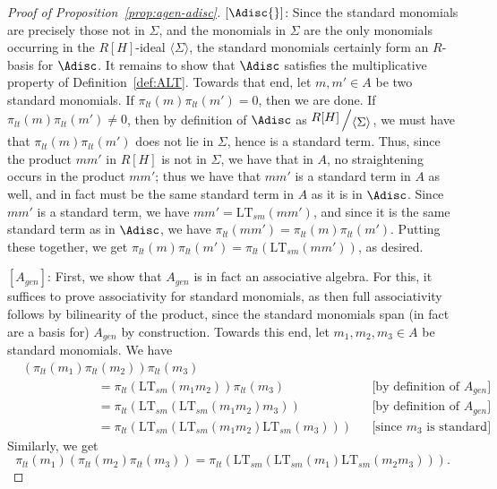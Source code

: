 \documentclass[11pt,reqno]{amsart}
\newcommand*{\eqcommentnear}[1]{&&\text{[#1]}}
\newcommand{\bigslant}[2]{{\raisebox{.2em}{$#1$}\left/\raisebox{-.2em}{$#2$}\right.}}
\newcommand{\ltsm}{\text{LT}_{sm}}
\theoremstyle{definition}
\numberwithin{equation}{section}
\begin{document}
\begin{proof}[Proof of Proposition~\ref{prop:agen-adisc}]
$[\Adisc{}]$: Since the standard monomials are precisely those not in $\Sigma$, and the monomials in $\Sigma$ are the only monomials occurring in the $R[H]$-ideal $\langle \Sigma \rangle$, the standard monomials certainly form an $R$-basis for $\Adisc$. It remains to show that $\Adisc$ satisfies the multiplicative property of Definition~\ref{def:ALT}. Towards that end, let $m,m' \in A$ be two standard monomials. If $\pi_{lt}(m) \pi_{lt}(m') = 0$, then we are done. If $\pi_{lt}(m) \pi_{lt}(m') \neq 0$, then by definition of $\Adisc$ as $\bigslant{R[H]}{\langle \Sigma \rangle}$, we must have that $\pi_{lt}(m) \pi_{lt}(m')$ does not lie in $\Sigma$, hence is a standard term. Thus, since the product $mm'$ in $R[H]$ is not in $\Sigma$, we have that in $A$, no straightening occurs in the product $mm'$; thus we have that $mm'$ is a standard term in $A$ as well, and in fact must be the same standard term in $A$ as it is in $\Adisc$. Since $mm'$ is a standard term, we have $mm' = \ltsm(mm')$, and since it is the same standard term as in $\Adisc$, we have $\pi_{lt}(mm') = \pi_{lt}(m) \pi_{lt}(m')$. Putting these together, we get $\pi_{lt}(m)\pi_{lt}(m') = \pi_{lt}(\ltsm(mm'))$, as desired.

$[A_{gen}]$: First, we show that $A_{gen}$ is in fact an associative algebra. For this, it suffices to prove associativity for standard monomials, as then full associativity follows by bilinearity of the product, since the standard monomials span (in fact are a basis for) $A_{gen}$ by construction. Towards this end, let $m_1, m_2, m_3 \in A$ be standard monomials. We have
\begin{align}
&(\pi_{lt}(m_1) \pi_{lt}(m_2)) \pi_{lt}(m_3) \nonumber \\
&\qquad \qquad \qquad = \pi_{lt}(\ltsm(m_1 m_2)) \pi_{lt}(m_3) \eqcommentnear{by definition of $A_{gen}$} \nonumber \\
 &\qquad \qquad \qquad  = \pi_{lt}(\ltsm(\ltsm(m_1 m_2) m_3)) \eqcommentnear{by definition of $A_{gen}$} \nonumber\\
 &\qquad \qquad \qquad  = \pi_{lt}(\ltsm(\ltsm(m_1 m_2) \ltsm(m_3))) \eqcommentnear{since $m_3$ is standard}. \label{eq:Agen1} 
\end{align}
Similarly, we get
\begin{equation}
\pi_{lt}(m_1) (\pi_{lt}(m_2) \pi_{lt}(m_3)) = \pi_{lt}(\ltsm(\ltsm(m_1) \ltsm(m_2 m_3))). \label{eq:Agen2}
\end{equation}


\end{proof}
\end{document}

